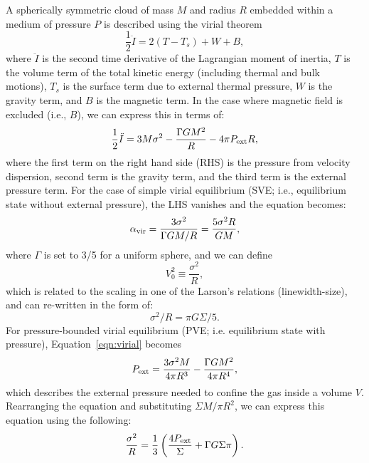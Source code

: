 \documentclass[iop]{emulateapj} %
\begin{document}
A spherically symmetric cloud of mass $M$ and radius $R$ embedded within
a medium of pressure $P$ is described using the virial theorem
\begin{equation}
\frac{1}{2}\ddot I = 2(T - T_s) + W + B,
\end{equation}
where $\ddot I$ is the second time derivative of the Lagrangian moment of inertia,
$T$ is the volume term of the total kinetic energy (including thermal and
bulk motions), $T_s$ is the surface term due to external thermal pressure,
$W$ is the gravity term, and $B$ is the magnetic term.
In the case where magnetic field is excluded (i.e., $B$), we can express this in terms of:
\begin{equation}
\frac{1}{2}\ddot I = 3 M \sigma^2 - \frac{\Gamma GM^2}{R} - 4\pi P_{\rm ext} R,
\label{eqn:virial}
\end{equation}
where the first term on the right hand side (RHS) is the pressure from velocity dispersion, second
term is the gravity term, and the third term is the external pressure term.
For the case of simple virial equilibrium (SVE; i.e., equilibrium state without external pressure),
the LHS vanishes and the equation becomes:
\begin{equation}
\alpha_{\rm vir} = \frac{3\sigma^2}{\Gamma GM/R} = \frac{5\sigma^2R}{GM},
\end{equation}
where $\Gamma$ is set to 3/5 for a uniform sphere, and we can define
\begin{equation}
V_0^2\equiv\frac{\sigma^2}{R},
\end{equation}
which is related to the scaling in one of the Larson's relations (linewidth-size),
and can re-written in the form of:
\begin{equation}
\sigma^2/R = \pi G \Sigma/5.
\end{equation}
For pressure-bounded virial equilibrium (PVE; i.e. equilibrium state with pressure), %
Equation~\ref{eqn:virial} becomes
\begin{equation}
P_{\rm ext} = \frac{3\sigma^2M}{4\pi R^3} - \frac{\Gamma G M^2}{4\pi R^4},
\label{eqn:pext}
\end{equation}
which describes the external pressure needed to confine the gas inside a volume $V$.
Rearranging the equation and substituting $\Sigma$\eq$M/\pi R^2$, we can express
this equation using the following:
\begin{equation}
\frac{\sigma^2}{R} = \frac{1}{3}\left(\frac{4P_{\rm ext}}{\Sigma} + \Gamma G \Sigma \pi \right).
\label{eqn:v0}
\end{equation}
\end{document}
